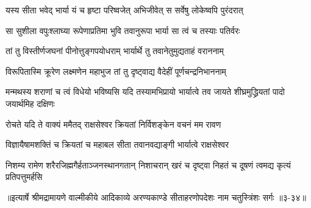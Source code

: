 \twolineshloka
{यस्य सीता भवेद् भार्या यं च हृष्टा परिष्वजेत्}
{अभिजीवेत् स सर्वेषु लोकेष्वपि पुरंदरात्} %

\twolineshloka
{सा सुशीला वपुःश्लाघ्या रूपेणाप्रतिमा भुवि}
{तवानुरूपा भार्या सा त्वं च तस्याः पतिर्वरः} %

\twolineshloka
{तां तु विस्तीर्णजघनां पीनोत्तुङ्गपयोधराम्}
{भार्यार्थे तु तवानेतुमुद्यताहं वराननाम्} %

\twolineshloka
{विरूपितास्मि क्रूरेण लक्ष्मणेन महाभुज}
{तां तु दृष्ट्वाद्य वैदेहीं पूर्णचन्द्रनिभाननाम्} %

\threelineshloka
{मन्मथस्य शराणां च त्वं विधेयो भविष्यसि}
{यदि तस्यामभिप्रायो भार्यात्वे तव जायते}
{शीघ्रमुद्ध्रियतां पादो जयार्थमिह दक्षिणः} %

\twolineshloka
{रोचते यदि ते वाक्यं ममैतद् राक्षसेश्वर}
{क्रियतां निर्विशङ्केन वचनं मम रावण} %

\twolineshloka
{विज्ञायैषामशक्तिं च क्रियतां च महाबल}
{सीता तवानवद्याङ्गी भार्यात्वे राक्षसेश्वर} %

\twolineshloka
{निशम्य रामेण शरैरजिह्मगैर्हताञ्जनस्थानगतान् निशाचरान्}
{खरं च दृष्ट्वा निहतं च दूषणं त्वमद्य कृत्यं प्रतिपत्तुमर्हसि} %


॥इत्यार्षे श्रीमद्रामायणे वाल्मीकीये आदिकाव्ये अरण्यकाण्डे सीताहरणोपदेशः नाम चतुस्त्रिंशः सर्गः ॥३-३४॥
